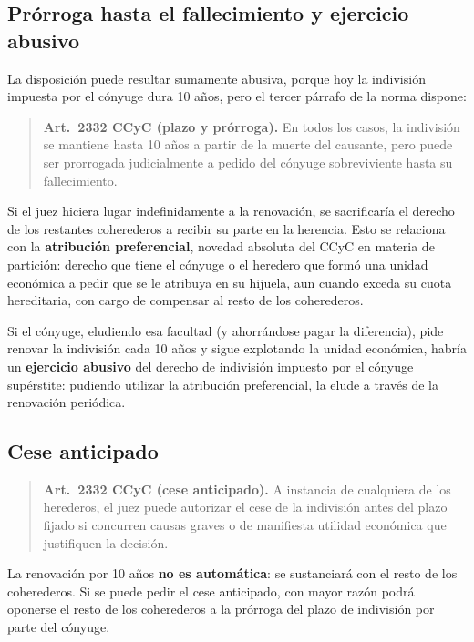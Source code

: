 \documentclass[12pt,oneside]{book}
\begin{document}
\subsection{Prórroga hasta el fallecimiento y ejercicio abusivo}

La disposición puede resultar sumamente abusiva, porque hoy la indivisión impuesta por el cónyuge dura 10 años, pero el tercer párrafo de la norma dispone:

\begin{quote}
\textbf{Art.~2332 CCyC (plazo y prórroga).} En todos los casos, la indivisión se mantiene hasta 10 años a partir de la muerte del causante, pero puede ser prorrogada judicialmente a pedido del cónyuge sobreviviente hasta su fallecimiento.
\end{quote}

Si el juez hiciera lugar indefinidamente a la renovación, se sacrificaría el derecho de los restantes coherederos a recibir su parte en la herencia. Esto se relaciona con la \textbf{atribución preferencial}, novedad absoluta del CCyC en materia de partición: derecho que tiene el cónyuge o el heredero que formó una unidad económica a pedir que se le atribuya en su hijuela, aun cuando exceda su cuota hereditaria, con cargo de compensar al resto de los coherederos.

\begin{important}
Si el cónyuge, eludiendo esa facultad (y ahorrándose pagar la diferencia), pide renovar la indivisión cada 10 años y sigue explotando la unidad económica, habría un \textbf{ejercicio abusivo} del derecho de indivisión impuesto por el cónyuge supérstite: pudiendo utilizar la atribución preferencial, la elude a través de la renovación periódica.
\end{important}

\subsection{Cese anticipado}

\begin{quote}
\textbf{Art.~2332 CCyC (cese anticipado).} A instancia de cualquiera de los herederos, el juez puede autorizar el cese de la indivisión antes del plazo fijado si concurren causas graves o de manifiesta utilidad económica que justifiquen la decisión.
\end{quote}

La renovación por 10 años \textbf{no es automática}: se sustanciará con el resto de los coherederos. Si se puede pedir el cese anticipado, con mayor razón podrá oponerse el resto de los coherederos a la prórroga del plazo de indivisión por parte del cónyuge.
\end{document}
